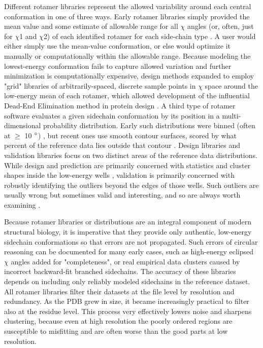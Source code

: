 Different rotamer libraries represent the allowed variability around each central conformation in one of three ways. Early rotamer libraries simply provided the mean value and some estimate of allowable range for all $\chi$ angles (or, often, just for $\chi$1 and $\chi$2) of each identified rotamer for each side-chain type \cite{Ponder1987, Tuffery1991,Schrauber1993}.  A user would either simply use the mean-value conformation, or else would optimize it manually or computationally within the allowable range. Because modeling the lowest-energy conformation fails to capture allowed variation and further minimization is computationally expensive, design methods expanded to employ "grid" libraries of arbitrarily-spaced, discrete sample points in $\chi$ space around the low-energy mean of each rotamer, which allowed development of the influential Dead-End Elimination method in protein design \cite{DeMaeyer1997,Gainza2013}.  A third type of rotamer software \cite{Dunbrack1997, Chen:2010kx} evaluates a given sidechain conformation by its position in a multi-dimensional probability distribution. Early such distributions were binned (often at $\ge$ 10 $\degree$) \cite{Laskowski:gl0276}, but recent ones use smooth contour surfaces, scored by what percent of the reference data lies outside that contour \cite{lovell2000penultimate, Read2011}. \textcolor{changecolor}{Design libraries and validation libraries focus on two distinct areas of the reference data distributions. While design and prediction are primarily concerned with statistics and cluster shapes inside the low-energy wells \cite{Dunbrack1997}, validation is primarily concerned with robustly identifying the outliers beyond the edges of those wells. Such outliers are usually wrong but sometimes valid and interesting, and so are always worth examining \cite{Richardson2013}.}

Because rotamer libraries or distributions are an integral component of modern structural biology, it is imperative that they provide only authentic, low-energy sidechain conformations so that errors are not propagated. Such errors of circular reasoning can be documented \cite{lovell2000penultimate} for many early cases, such as high-energy eclipsed $\chi$ angles added for "completeness", or real empirical data clusters caused by incorrect backward-fit branched sidechains. The accuracy of these libraries depends on including only reliably modeled sidechains in the reference dataset. All rotamer libraries filter their datasets at the file level by resolution and redundancy. As the PDB grew in size, it  became increasingly practical to filter also at the residue level. This process very effectively lowers noise and sharpens clustering, because even at high resolution the poorly ordered regions are susceptible to misfitting and are often worse than the good parts at low resolution.

